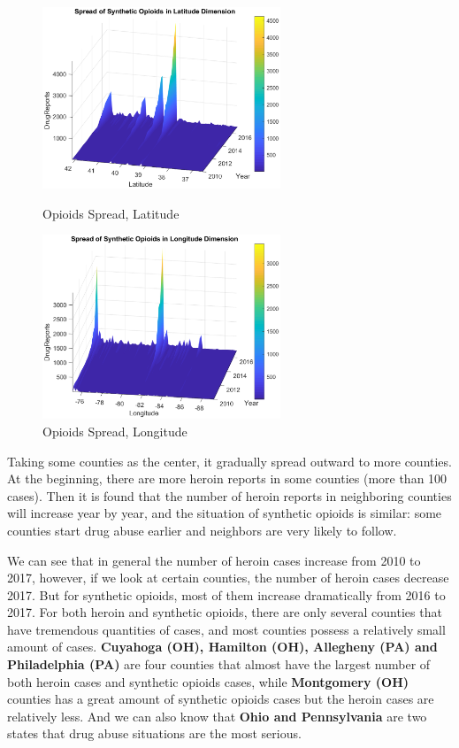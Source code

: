 \documentclass{mcmthesis}
\numberwithin{equation}{section}
\numberwithin{figure}{section}
\numberwithin{table}{section}
\theoremstyle{mydef}
\begin{document}
 \begin{figure}[!htbp]
\begin{minipage}[t]{0.5\linewidth}
\centering
\includegraphics[width=2.8in]{./picture/spsola.eps}
\caption{Opioids Spread, Latitude}
\label{figl2}
\end{minipage}%
\begin{minipage}[t]{0.5\linewidth}
\centering
\includegraphics[width=2.8in]{./picture/spsolong.eps}
\caption{Opioids Spread, Longitude}
\label{figr2}
\end{minipage}
\end{figure}

Taking some counties as the center, it gradually spread outward to more counties. At the beginning, there are more heroin reports in some counties (more than 100 cases). Then it is found that the number of heroin reports in neighboring counties will increase year by year, and the situation of synthetic opioids is similar: some counties start drug abuse earlier and neighbors are very likely to follow.

We can see that in general the number of heroin cases increase from 2010 to 2017, however, if we look at certain counties, the number of heroin cases decrease  2017. But for synthetic opioids, most of them increase dramatically from 2016 to 2017. For both heroin and synthetic opioids, there are only several counties that have tremendous quantities of cases, and most counties possess a relatively small amount of cases. {\bf{Cuyahoga (OH), Hamilton (OH), Allegheny (PA) and Philadelphia (PA)}} are four counties that almost have the largest number of both heroin cases and synthetic opioids cases, while  {\bf{Montgomery (OH)}} counties has a great amount of synthetic opioids cases but the heroin cases are relatively less. And we can also know that {\bf {Ohio and Pennsylvania}} are two states that drug abuse situations are the most serious.
\end{document}
